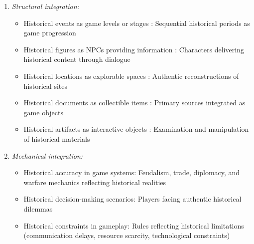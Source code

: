 \documentclass[a4paper,fleqn]{cas-sc}
\begin{document}
\begin{enumerate}[noitemsep]
	\item 
\textit{Structural integration:}
\begin{itemize}[noitemsep]
 \item Historical events as game levels or stages \citep{9Lin2018, 13Humpire2022, 18Shih201054, 22Nugroho2020149, 47Clara2010156, 77Ramansyah2021}: Sequential historical periods as game progression
 
 \item Historical figures as NPCs providing information \citep{4Cruz2017, 9Lin2018, 18Shih201054, 55Squire2004, 63Liu2021}: Characters delivering historical content through dialogue
 
 \item Historical locations as explorable spaces \citep{1Barbatsis201159, 18Shih201054, 25Repantis2011502, 39Tegos2014838, 48Moketar2021, 49Huizenga2007127, 54Gibson2007, 58Shih2015173, 59Kee2014270, 73Wolfartsberger2011160, 77Ramansyah2021}: Authentic reconstructions of historical sites
 
 \item Historical documents as collectible items \citep{16Chen201447, 54Gibson2007, 55Squire2004, 80gottlieb2018your}: Primary sources integrated as game objects
 
 \item Historical artifacts as interactive objects \citep{1Barbatsis201159, 15Slater2022, 22Nugroho2020149, 32Cheng20241718, 48Moketar2021, 58Shih2015173}: Examination and manipulation of historical materials
\end{itemize}

	\item 
\textit{Mechanical integration:}
\begin{itemize}[noitemsep]
 \item Historical accuracy in game systems: Feudalism, trade, diplomacy, and warfare mechanics reflecting historical realities \citep{8Yu2014, 29Stiso20201165, 51Ardito2007, 55Squire2004, 74Fendt2019, 75trajano2014using}
 
 \item Historical decision-making scenarios: Players facing authentic historical dilemmas \citep{3Watson2011466, 20Erandaru2014, 29Stiso20201165, 60Hoy2018}
 
 \item Historical constraints in gameplay: Rules reflecting historical limitations (communication delays, resource scarcity, technological constraints) \citep{29Stiso20201165}
 

\end{itemize}
\end{enumerate}
\end{document}
